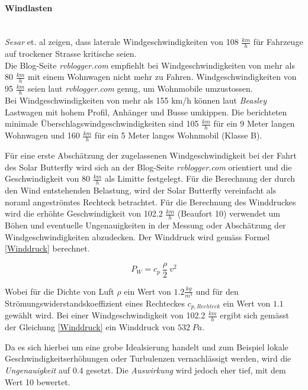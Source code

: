   \paragraph{Windlasten}\mbox{}\\
  \emph{Sesar} et. al \cite{Wind.1} zeigen, dass laterale Windgeschwindigkeiten von 108 $\frac{km}{h}$ für Fahrzeuge auf trockener Strasse kritische seien.\\
  Die Blog-Seite \emph{rvblogger.com} \cite{Wind.2} empfiehlt bei Windgeschwindigkeiten von mehr als 80 $\frac{km}{h}$ mit einem Wohnwagen nicht mehr zu Fahren. Windgeschwindigkeiten von 95 $\frac{km}{h}$ seien laut \emph{rvblogger.com} genug, um Wohnmobile umzustossen.\\
  Bei Windgeschwindigkeiten von mehr als 155 km/h können laut \emph{Beasley} \cite{Wind.3} Lastwagen mit hohem Profil, Anhänger und Busse umkippen. Die berichteten minimale Überschlagswindgeschwindigkeiten sind 105 $\frac{km}{h}$ für ein 9 Meter langen Wohnwagen und 160 $\frac{km}{h}$ für ein 5 Meter langes Wohnmobil (Klasse B).

  Für eine erste Abschätzung der zugelassenen Windgeschwindigkeit bei der Fahrt des Solar Butterfly wird sich an der Blog-Seite \emph{rvblogger.com} orientiert und die Geschwindigkeit von 80 $\frac{km}{h}$ als Limitte festgelegt. Für die Berechnung der durch den Wind entstehenden Belastung, wird der Solar Butterfly vereinfacht als noraml angeströmtes Rechteck betrachtet. Für die Berechnung des Winddruckes wird die erhöhte Geschwindigkeit von 102.2 $\frac{km}{h}$ (Beaufort 10) verwendet um Böhen und eventuelle Ungenauigkeiten in der Messung oder Abschätzung der Windgeschwindigkeiten abzudecken. Der Winddruck wird gemäss Formel \ref{Winddruck} berechnet.

  \begin{equation}
    \label{Winddruck}
    P_W = c_p \: \frac{\rho}{2}\: v^2
  \end{equation}

  Wobei für die Dichte von Luft $\rho$ ein Wert von $1.2 \frac{kg}{m^3}$ und für den Strömungswiderstandskoeffizient eines Rechteckes $c_{p,Rechteck}$ ein Wert von $1.1$ gewählt wird. Bei einer Windgeschwindigkeit von 102.2 $\frac{km}{h}$ ergibt sich gemässt der Gleichung \ref{Winddruck} ein Winddruck von $532 \; Pa$.

  Da es sich hierbei um eine grobe Idealsierung handelt und zum Beispiel lokale Geschwindigkeitserhöhungen oder Turbulenzen vernachlässigt werden, wird die \emph{Ungenauigkeit} auf 0.4 gesetzt. Die \emph{Auswirkung} wird jedoch eher tief, mit dem Wert 10 bewertet.

